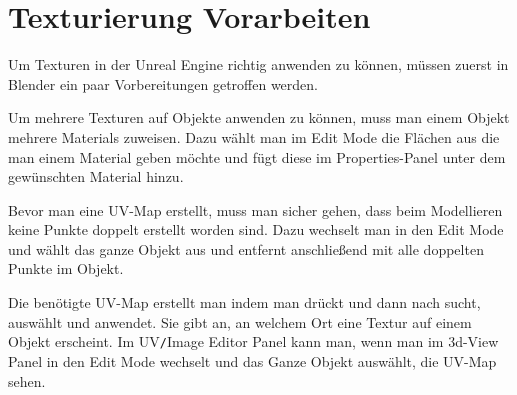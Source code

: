 \section{Texturierung Vorarbeiten}
Um Texturen in der Unreal Engine richtig anwenden zu können, müssen zuerst in Blender ein paar Vorbereitungen getroffen werden.

Um mehrere Texturen auf Objekte anwenden zu können, muss man einem Objekt mehrere Materials zuweisen. Dazu wählt man im Edit Mode die Flächen aus die man einem Material geben
möchte und fügt diese im Properties-Panel unter  dem gewünschten Material hinzu.

Bevor man eine UV-Map erstellt, muss man sicher gehen, dass beim Modellieren keine Punkte
doppelt erstellt worden sind. Dazu wechselt man in den Edit Mode und wählt das ganze Objekt aus und entfernt anschließend mit  
alle doppelten Punkte im Objekt.

Die benötigte UV-Map erstellt man indem man \keys{\SPACE} drückt und dann nach  sucht, auswählt und anwendet. Sie gibt an, an welchem Ort
eine Textur auf einem Objekt erscheint. Im UV\verb-/-Image Editor Panel kann man, wenn man im 3d-View Panel in den Edit Mode
wechselt und das Ganze Objekt auswählt, die UV-Map sehen.

